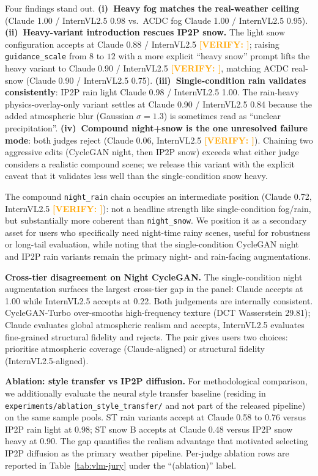 \documentclass[12pt]{article}
\newcommand{\verify}[1]{\textcolor{orange}{\textbf{[VERIFY: #1]}}}
\begin{document}
Four findings stand out. \textbf{(i)~Heavy fog matches the real-weather ceiling} (Claude 1.00 / InternVL2.5 0.98 vs.\ ACDC fog Claude 1.00 / InternVL2.5 0.95). \textbf{(ii)~Heavy-variant introduction rescues IP2P snow.} The light snow configuration accepts at Claude 0.88 / InternVL2.5 \verify{}; raising \texttt{guidance\_scale} from $8$ to $12$ with a more explicit ``heavy snow'' prompt lifts the heavy variant to Claude 0.90 / InternVL2.5 \verify{}, matching ACDC real-snow (Claude 0.90 / InternVL2.5 0.75). \textbf{(iii)~Single-condition rain validates consistently}: IP2P rain light Claude 0.98 / InternVL2.5 1.00. The rain-heavy physics-overlay-only variant settles at Claude 0.90 / InternVL2.5 0.84 because the added atmospheric blur (Gaussian $\sigma{=}1.3$) is sometimes read as ``unclear precipitation''. \textbf{(iv)~Compound night+snow is the one unresolved failure mode}: both judges reject (Claude 0.06, InternVL2.5 \verify{}). Chaining two aggressive edits (CycleGAN night, then IP2P snow) exceeds what either judge considers a realistic compound scene; we release this variant with the explicit caveat that it validates less well than the single-condition snow heavy.

The compound \texttt{night\_rain} chain occupies an intermediate position (Claude 0.72, InternVL2.5 \verify{}): not a headline strength like single-condition fog/rain, but substantially more coherent than \texttt{night\_snow}. We position it as a secondary asset for users who specifically need night-time rainy scenes, useful for robustness or long-tail evaluation, while noting that the single-condition CycleGAN night and IP2P rain variants remain the primary night- and rain-facing augmentations.

\textbf{Cross-tier disagreement on Night CycleGAN.} The single-condition night augmentation surfaces the largest cross-tier gap in the panel: Claude accepts at 1.00 while InternVL2.5 accepts at 0.22. Both judgements are internally consistent. CycleGAN-Turbo over-smooths high-frequency texture (DCT Wasserstein 29.81); Claude evaluates global atmospheric realism and accepts, InternVL2.5 evaluates fine-grained structural fidelity and rejects. The pair gives users two choices: prioritise atmospheric coverage (Claude-aligned) or structural fidelity (InternVL2.5-aligned).

\textbf{Ablation: style transfer vs IP2P diffusion.} For methodological comparison, we additionally evaluate the neural style transfer baseline (residing in \texttt{experiments/ablation\_style\_transfer/} and not part of the released pipeline) on the same sample pools. ST rain variants accept at Claude 0.58 to 0.76 versus IP2P rain light at 0.98; ST snow B accepts at Claude 0.48 versus IP2P snow heavy at 0.90. The gap quantifies the realism advantage that motivated selecting IP2P diffusion as the primary weather pipeline. Per-judge ablation rows are reported in Table~\ref{tab:vlm-jury} under the ``(ablation)'' label.
\end{document}
